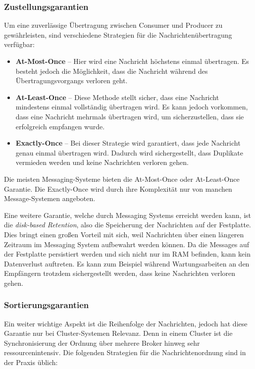 \subsubsection{Zustellungsgarantien}

Um eine zuverlässige Übertragung zwischen Consumer und Producer zu gewährleisten, sind verschiedene Strategien für die Nachrichtenübertragung verfügbar: \cite{fuFairComparisonMessage2021}

\begin{itemize}
	\item \textbf{At-Most-Once} – Hier wird eine Nachricht höchstens einmal übertragen. Es besteht jedoch die Möglichkeit, dass die Nachricht während des Übertragungsvorgangs verloren geht.
	\item \textbf{At-Least-Once} –  Diese Methode stellt sicher, dass eine Nachricht mindestens einmal vollständig übertragen wird. Es kann jedoch vorkommen, dass eine Nachricht mehrmals übertragen wird, um sicherzustellen, dass sie erfolgreich empfangen wurde.
	\item \textbf{Exactly-Once} – Bei dieser Strategie wird garantiert, dass jede Nachricht genau einmal übertragen wird. Dadurch wird sichergestellt, dass Duplikate vermieden werden und keine Nachrichten verloren gehen.
\end{itemize}

Die meisten Messaging-Systeme bieten die At-Most-Once oder At-Least-Once Garantie. Die Exactly-Once wird durch ihre Komplexität nur von manchen Message-Systemen angeboten. \cite{fuFairComparisonMessage2021}

Eine weitere Garantie, welche durch Messaging Systems erreicht werden kann, ist die \emph{disk-based Retention}, also die Speicherung der Nachrichten auf der Festplatte. Dies bringt einen großen Vorteil mit sich, weil Nachrichten über einen längeren Zeitraum im Messaging System aufbewahrt werden können. Da die Messages auf der Festplatte persistiert werden und sich nicht nur im RAM befinden, kann kein Datenverlust auftreten. Es kann zum Beispiel während Wartungsarbeiten an den Empfängern trotzdem sichergestellt werden, dass keine Nachrichten verloren gehen. \cite{narkhedeKafkaDefinitiveGuide2017}

\subsubsection{Sortierungsgarantien}

Ein weiter wichtige Aspekt ist die Reihenfolge der Nachrichten, jedoch hat diese Garantie nur bei Cluster-Systemen Relevanz. Denn in einem Cluster ist die Synchronisierung der Ordnung über mehrere Broker hinweg sehr ressourcenintensiv. Die folgenden Strategien für die Nachrichtenordnung sind in der Praxis üblich: \cite{fuFairComparisonMessage2021}

